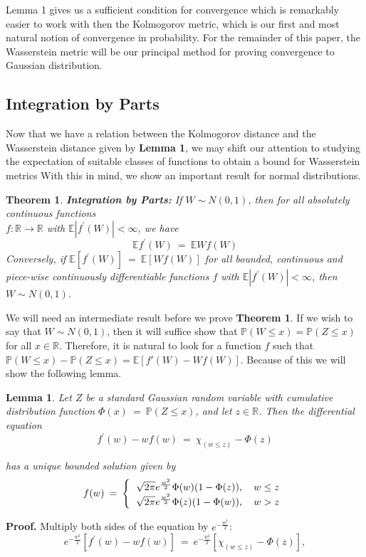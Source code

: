 \documentclass[12pt]{article}
\newcommand{\e}{\mathbb{E}}
\newcommand{\p}{\mathbb{P}}
\newcommand{\eq }{\: = \:}
\newtheorem{lemma}{Lemma}
\newtheorem{theorem}{Theorem}
\theoremstyle{nonumberplain}
\begin{document}
Lemma 1 gives us a sufficient condition for convergence which is remarkably easier to work with then the Kolmogorov metric, which is our first and most natural notion of convergence in probability. For the remainder of this paper, the Wasserstein metric will be our principal method for proving convergence to Gaussian distribution.

\subsection{Integration by Parts}

Now that we have a relation between the Kolmogorov distance and the Wasserstein distance given by \textbf{Lemma 1}, we may shift our attention to studying the expectation of suitable classes of functions to obtain a bound for Wasserstein metrics With this in mind, we show an important result for normal distributions.

\pagebreak
\begin{theorem} \textbf{Integration by Parts:}
If $W \sim N(0,1)$, then for all absolutely continuous functions \\
$f:\mathbb{R} \rightarrow \mathbb{R}$ with $\mathbb{E}|f^{\prime}(W)|<\infty$, we have\\
\begin{equation}
\mathbb{E}f^{\prime}(W)\eq \mathbb{E}Wf(W)
\end{equation}
Conversely, if $\mathbb{E}[f^{\prime}(W)]\eq \mathbb{E}[Wf(W)]$ for all bounded, continuous and piece-wise continuously differentiable functions $f$ with $\mathbb{E}|f^{\prime}(W)|<\infty$, then $W \sim N(0, 1)$.
\end{theorem}

We will need an intermediate result before we prove \textbf{Theorem 1}. If we wish to say that $W \sim N(0, 1)$, then it will suffice show that $\p(W \le x) = \p(Z \le x)$ for all $x\in \mathbb{R}$. Therefore, it is natural to look for a function $f$ such that $\p(W \le x) - \p(Z \le x) = \e[f'(W) - Wf(W)]$. Because of this we will show the following lemma.

\begin{lemma}
Let $Z$ be a standard Gaussian random variable with cumulative distribution function $\Phi(x) \eq  \p(Z \le x)$, and let $z \in \mathbb{R}$. Then the differential equation
$$
f^{\prime}(w)-wf(w) \eq  \chi_{(w\leq z)}-\Phi(z)
$$

has a unique bounded solution given by
\begin{equation}
f(w)\eq 
\left \{
  \begin{tabular}{cc}
  $\sqrt{2\pi}e^{\frac{w^{2}}{2}} \Phi(w)(1-\Phi(z)), \quad  w\leq z$ \\
  $\sqrt{2\pi}e^{\frac{w^{2}}{2}} \Phi(z)(1-\Phi(w)), \quad w > z$   \\
  \end{tabular}
\right.
\end{equation}
\end{lemma}
\textbf{Proof.} Multiply both sides of the equation by $e^{-\frac{w^2}{2}}$:
$$
e^{-\frac{w^{2}}{2}}[f^{\prime}(w)-wf(w)]\eq  e^{-\frac{w^{2}}{2}}[\chi_{(w\leq z)}-\Phi(z)],
$$
\end{document}
